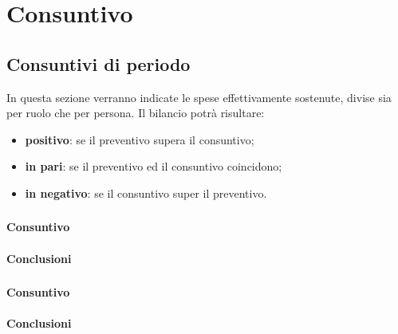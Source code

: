\documentclass[./PianoDiProgetto.tex]{subfiles}
\begin{document}
\section{Consuntivo}
\subsection{Consuntivi di periodo}
In questa sezione verranno indicate le spese effettivamente sostenute, divise sia
per ruolo che per persona. Il bilancio potrà risultare:
\begin{itemize}
  \item \textbf{positivo}: se il preventivo supera il consuntivo;
  \item \textbf{in pari}: se il preventivo ed il consuntivo coincidono;
  \item \textbf{in negativo}: se il consuntivo super il preventivo.
\end{itemize}
\subsubsection{\PerAR}

\subsubsection{\PerAD}

  \paragraph{Consuntivo}

  \paragraph{Conclusioni}

\subsubsection{\PerPA}

  \paragraph{Consuntivo}

  \paragraph{Conclusioni}

\subsubsection{\PerPD}
\end{document}
